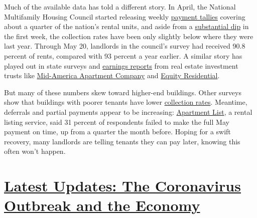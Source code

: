Much of the available data has told a different story. In April, the
National Multifamily Housing Council started releasing weekly
\href{https://www.nmhc.org/research-insight/nmhc-rent-payment-tracker/}{payment
tallies} covering about a quarter of the nation's rental units, and
aside from a
\href{https://www.nytimes.com/2020/04/08/business/economy/coronavirus-rent.html}{substantial
dip} in the first week, the collection rates have been only slightly
below where they were last year. Through May 20, landlords in the
council's survey had received 90.8 percent of rents, compared with 93
percent a year earlier. A similar story has played out in state surveys
and
\href{https://www.wsj.com/articles/high-end-apartment-owners-dodge-economic-slump-11590494401?emailToken=7af94d1507aba35de1477aea302a17e246hHQSXuT8AowEI0zTGOdHODX64FAs5KBUKvaHttT+ROlMHWE/QuAqz0LNAL454jv8gJc2RCvYF+n6ctvCL88yTvyf22xn2yycQF/R7OmDg\%3D\&reflink=article_gmail_share}{earnings
reports} from real estate investment trusts like
\href{http://ir.maac.com/Cache/IRCache/5f994f94-850d-3395-cd7d-3dc6624075c9.PDF?O=PDF\&T=\&Y=\&D=\&FID=5f994f94-850d-3395-cd7d-3dc6624075c9\&iid=103123}{Mid-America
Apartment Company} and
\href{http://investors.equityapartments.com/file/Index?KeyFile=403555723}{Equity
Residential}.

But many of these numbers skew toward higher-end buildings. Other
surveys show that buildings with poorer tenants have lower
\href{https://olis.oregonlegislature.gov/liz/2019I1/Downloads/CommitteeMeetingDocument/221959}{collection
rates}. Meantime, deferrals and partial payments appear to be
increasing:
\href{https://www.apartmentlist.com/rentonomics/may-housing-payments/}{Apartment
List}, a rental listing service, said 31 percent of respondents failed
to make the full May payment on time, up from a quarter the month
before. Hoping for a swift recovery, many landlords are telling tenants
they can pay later, knowing this often won't happen.

\hypertarget{latest-updates-the-coronavirus-outbreak-and-the-economy}{%
\section{\texorpdfstring{\href{https://www.nytimes.com/live/2020/08/07/business/stock-market-today-coronavirus?action=click\&pgtype=Article\&state=default\&region=MAIN_CONTENT_1\&context=storylines_live_updates}{Latest
Updates: The Coronavirus Outbreak and the
Economy}}{Latest Updates: The Coronavirus Outbreak and the Economy}}\label{latest-updates-the-coronavirus-outbreak-and-the-economy}}

